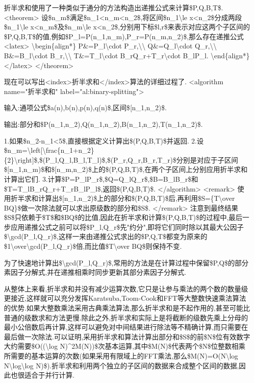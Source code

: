 \documentclass[
]{article}
\begin{document}
折半求和使用了一种类似于通分的方法构造出递推公式来计算\$P,Q,B,T\$.
\textless theorem\textgreater{}
设\$n\_m\$满足\$n\_1\textless n\_m\textless n\_2\$,将区间\$n\_1\textbackslash le
x\textless n\_2\$分成两段\$n\_1\textbackslash le
x\textless n\_m\$及\$n\_m\textbackslash le
x\textless n\_2\$,分别用下标\$l,r\$来表示对应这两个子区间的\$P,Q,B,T\$的值,例如\$P\_l=P(n\_1,n\_m),P\_r=P(n\_m,n\_2)\$,那么存在递推公式
\textless latex\textgreater{} \textbackslash begin\{align*\}
P\&=P\_l\textbackslash cdot P\_r,\textbackslash\textbackslash{}
Q\&=Q\_l\textbackslash cdot Q\_r,\textbackslash\textbackslash{}
B\&=B\_l\textbackslash cdot B\_r,\textbackslash\textbackslash{}
T\&=T\_l\textbackslash cdot B\_rQ\_r+T\_r\textbackslash cdot B\_lP\_l.
\textbackslash end\{align*\} \textless/latex\textgreater{}
\textless/theorem\textgreater{}

现在可以写出\textless index\textgreater 折半求和\textless/index\textgreater 算法的详细过程了.
\textless algorithm name="折半求和"
label="al:binary-splitting"\textgreater{}

输入:通项公式\$a(n),b(n),p(n),q(n)\$,区间\${[}n\_1,n\_2)\$.

输出:部分和\$P(n\_1,n\_2),Q(n\_1,n\_2),B(n\_1,n\_2),T(n\_1,n\_2)\$.

1.如果\$n\_2-n\_1\textless5\$,直接根据定义计算出\$(P,Q,B,T)\$并返回.
2.设\$n\_m=\textbackslash left{[}\textbackslash frac\{n\_1+n\_2\}\{2\}\textbackslash right{]}\$,\$(P\_l,Q\_l,B\_l,T\_l)\$,\$(P\_r,Q\_r,B\_r,T\_r)\$分别是对应于子区间\${[}n\_1,n\_m)\$和\${[}n\_m,n\_2)\$上的\$(P,Q,B,T)\$,在两个子区间上分别应用折半求和计算出它们.
3.计算\$P=P\_lP\_r\$,\$Q=Q\_lQ\_r\$,\$B=B\_lB\_r\$和\$T=T\_lB\_rQ\_r+T\_rB\_lP\_l\$,返回\$(P,Q,B,T)\$.
\textless/algorithm\textgreater{} \textless remark\textgreater{}
使用折半求和计算出\${[}n\_1,n\_2)\$上的部分和\$(P,Q,B,T)\$后,再利用\$S=\{T\textbackslash over
BQ\}\$做一次除法就可以求出原级数的部分和\$S\$.
\textless/remark\textgreater{}
注意到最终结果\$S\$只依赖于\$T\$和\$BQ\$的比值,因此在折半求和计算\$(P,Q,B,T)\$的过程中,最后一步应用递推公式之前可以将\$P\_l,Q\_r\$先"约分",即将它们同时除以其最大公因子\$\textbackslash gcd(P\_l,Q\_r)\$,这样一来由递推公式求出的\$P,Q,T\$都变为原来的\$1\textbackslash over\textbackslash gcd(P\_l,Q\_r)\$倍,而比值\$T\textbackslash over
BQ\$则保持不变.

为了快速地计算出\$\textbackslash gcd(P\_l,Q\_r)\$,常用的方法是在计算过程中保留\$P,Q\$的部分素因子分解式,并在递推相乘时同步更新其部分素因子分解式.

从整体上来看,折半求和并没有减少运算次数,它只是让参与乘法的两个数的数量级更接近,这样就可以充分发挥Karatsuba,Toom-Cook和FFT等大整数快速乘法算法的优势.如果大整数乘法采用古典乘法算法,那么折半求和是不起作用的,甚至可能比普通的级数求和方法更慢.除此之外,折半求和实际上是将截断的级数先乘上分母的最小公倍数后再计算,这样可以避免对中间结果进行除法等不精确计算,而只需要在最后做一次除法.可以证明,采用折半求和算法计算出部分和\$S\$的前\$N\$位有效数字大约需要\$O((\textbackslash log
N)\^{}2M(N))\$次基本运算,其中\$M(N)\$代表两个\$N\$位整数相乘所需要的基本运算的次数(如果采用有限域上的FFT乘法,那么\$M(N)=O(N\textbackslash log
N\textbackslash log\textbackslash log
N)\$).折半求和利用两个独立的子区间的数据来合成整个区间的数据,因此也很适合于并行计算.
\end{document}
